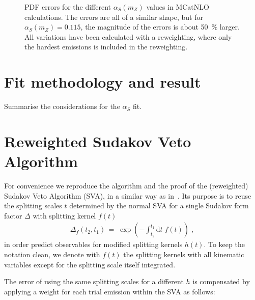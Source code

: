 \documentclass[a4paper]{scrartcl}
\newcommand{\alphas}{\ensuremath{\alpha_S}\xspace}
\newcommand{\tvar}{\ensuremath{t}\xspace}
\newcommand{\diff}{\ensuremath{\text{d}}\xspace}
\begin{document}
\begin{figure}[p]
    \caption{PDF errors for the different $\alphas(m_Z)$ values
    in MCatNLO calculations.
    The errors are all of a similar shape, but for $\alphas(m_Z)=0.115$,
    the magnitude of the errors is about \SI{50}{\percent} larger.
    All variations have been calculated with a reweighting,
    where only the hardest emissions is included in the reweighting.}
    \label{fig:pdferrors}
\end{figure}
\section{Fit methodology and result}
Summarise the considerations for the \alphas fit.


\section{Reweighted Sudakov Veto Algorithm}
For convenience we reproduce the algorithm and the proof of the (reweighted)
Sudakov Veto Algorithm (SVA), in a similar way as
in~\cite{Hoeche:2009xc,Lonnblad:2012hz}.  Its purpose is to reuse the splitting
scales $\tvar$ determined by the normal SVA for a single Sudakov form factor
$\Delta$ with splitting kernel $f(\tvar)$
\begin{equation}
  \label{eq:sva_sudakov}
  \begin{split}
      \Delta_f(\tvar_2,\tvar_1)
    \,=\;\exp\left(-\int_{\tvar_2}^{\tvar_1}
         \diff \tvar\;
         f(\tvar)
         \right)\;,
  \end{split}
\end{equation}
in order predict observables for modified splitting kernels $h(\tvar)$.  To
keep the notation clean, we denote with $f(\tvar)$ the splitting kernels with
all kinematic variables except for the splitting scale itself integrated.

The error of using the same splitting scales for a different $h$ is compensated
by applying a weight for each trial emission within the SVA as follows:
\end{document}
